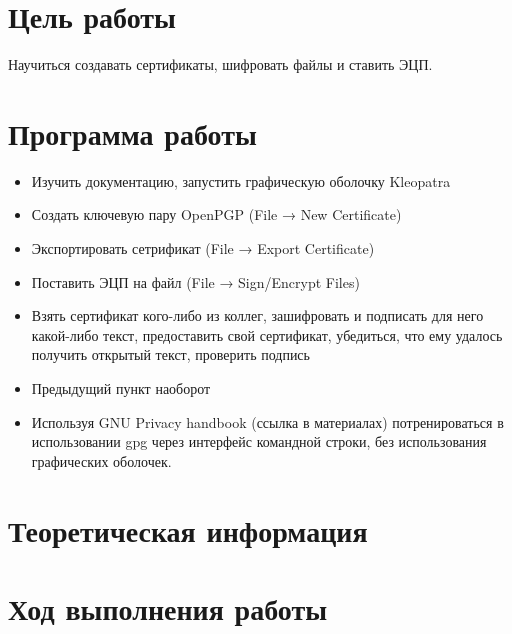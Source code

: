 \documentclass[a4paper]{article}
\begin{document}
\vfill %


\tableofcontents
\newpage



\section{Цель работы}

Научиться создавать сертификаты, шифровать файлы и ставить ЭЦП.

\section{Программа работы}

\begin{itemize}

\item Изучить документацию, запустить графическую оболочку Kleopatra

\item Создать ключевую пару OpenPGP (File → New Certificate)

\item Экспортировать сетрификат (File → Export Certificate)

\item Поставить ЭЦП на файл (File → Sign/Encrypt Files)

\item Взять сертификат кого-либо из коллег, зашифровать и подписать для него какой-либо текст, предоставить свой сертификат, убедиться, что ему удалось получить открытый текст, проверить подпись

\item Предыдущий пункт наоборот

\item Используя GNU Privacy handbook (ссылка в материалах) потренироваться в использовании gpg через интерфейс командной строки, без использования графических оболочек.

\end{itemize}


\section{Теоретическая информация}


\section{Ход выполнения работы}
\end{document}
